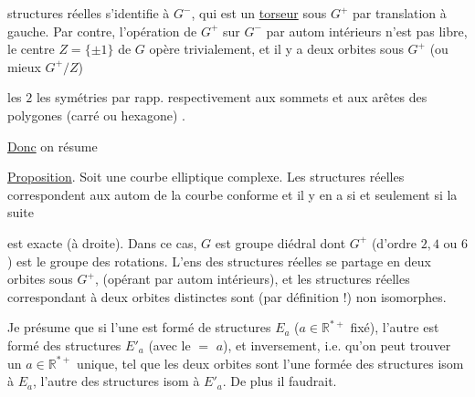 
structures réelles s'identifie à $G^-$, qui est un \uline{torseur} sous $G^+$ par translation à gauche. Par contre, l'opération de $G^+$ sur $G^-$ par autom intérieurs n'est pas libre, le centre $Z=\{\pm1\}$ de $G$ opère trivialement, et il y a deux orbites sous $G^+$ (ou mieux $G^+/Z$)

 les $2$   les symétries par rapp. respectivement aux sommets et aux arêtes des  polygones (carré ou hexagone) .


\uline{Donc} on résume

\uline{Proposition}. Soit une courbe elliptique  complexe.  Les structures réelles    correspondent aux  autom  de la courbe  conforme   et il y en a si et seulement si la suite


est exacte (à droite). Dans ce cas, $G$ est   groupe diédral  dont $G^+$ (d'ordre $2,4$ ou $6$) est le groupe des rotations. L'ens des structures réelles se partage en deux orbites sous $G^+$, (opérant par autom intérieurs), et les structures réelles correspondant à deux orbites distinctes sont (par définition !) non isomorphes. 

Je présume que si l'une est formé de structures $E_a$ ($a\in\mathbb R^{*+}$ fixé), l'autre est formé des structures $E'_a$ (avec le $=$ $a$), et inversement, i.e. qu'on peut trouver un $a\in\mathbb R^{*+}$ unique, tel que les deux orbites sont l'une formée des structures isom à $E_a$, l'autre des structures isom à $E'_a$. De plus il faudrait.

